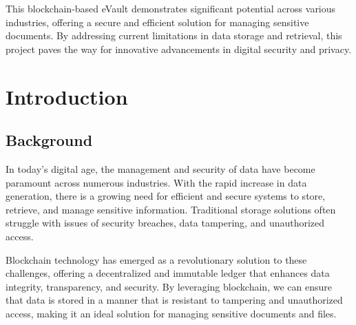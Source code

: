 \documentclass[12pt,a4paper]{report}
\begin{document}
This blockchain-based eVault demonstrates significant potential 
across various industries, offering a secure and efficient 
solution for managing sensitive documents. By addressing current 
limitations in data storage and retrieval, this project paves 
the way for innovative advancements in digital security and 
privacy.

\renewcommand{\contentsname}{Table of Contents}
\tableofcontents
{}
\listoffigures
{}
\listoftables
{}
\newpage


\pagestyle{fancy}
\fancyhf{}
\renewcommand{\headrulewidth}{0.5pt}
\renewcommand{\footrulewidth}{0.5pt}




\chapter{Introduction}

\section{Background}

In today's digital age, the management and security of data have become paramount across numerous industries. With the rapid increase in data generation, there is a growing need for efficient and secure systems to store, retrieve, and manage sensitive information. Traditional storage solutions often struggle with issues of security breaches, data tampering, and unauthorized access. 

Blockchain technology has emerged as a revolutionary solution to these challenges, offering a decentralized and immutable ledger that enhances data integrity, transparency, and security. By leveraging blockchain, we can ensure that data is stored in a manner that is resistant to tampering and unauthorized access, making it an ideal solution for managing sensitive documents and files.
\end{document}

